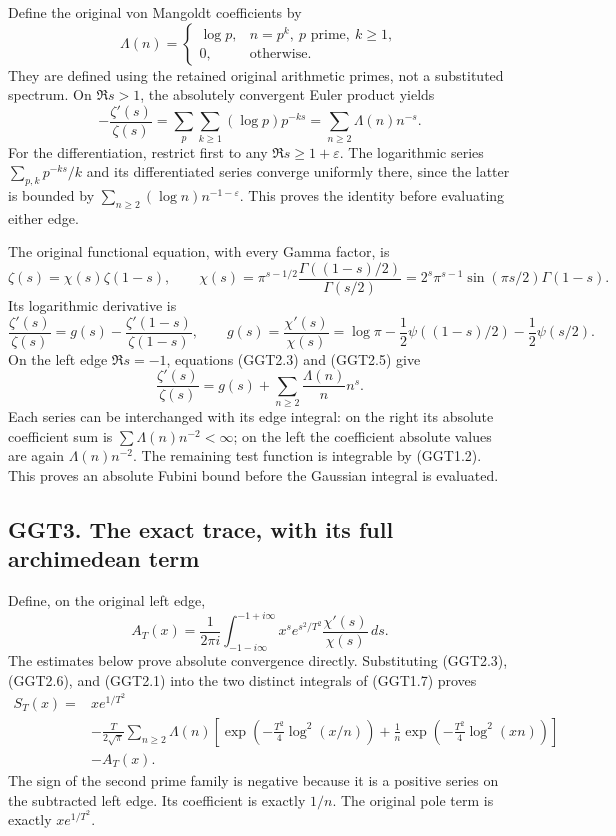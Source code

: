 Define the original von Mangoldt coefficients by \[
\Lambda(n)=
\begin{cases}\log p,&n=p^k,\ p\text{ prime},\ k\ge1,\\0,&\text{otherwise}.\end{cases}
\tag{GGT2.2}
\] They are defined using the retained original arithmetic primes, not a
substituted spectrum. On \(\Re s>1\), the absolutely convergent Euler
product yields \[
-\frac{\zeta'(s)}{\zeta(s)}
=\sum_p\sum_{k\ge1}(\log p)p^{-ks}
=\sum_{n\ge2}\Lambda(n)n^{-s}.
\tag{GGT2.3}
\] For the differentiation, restrict first to any
\(\Re s\ge1+\varepsilon\). The logarithmic series
\(\sum_{p,k}p^{-ks}/k\) and its differentiated series converge uniformly
there, since the latter is bounded by
\(\sum_{n\ge2}(\log n)n^{-1-\varepsilon}\). This proves the identity
before evaluating either edge.

The original functional equation, with every Gamma factor, is \[
\zeta(s)=\chi(s)\zeta(1-s),\qquad
\chi(s)=\pi^{s-1/2}
\frac{\Gamma((1-s)/2)}{\Gamma(s/2)}
=2^s\pi^{s-1}\sin(\pi s/2)\Gamma(1-s).
\tag{GGT2.4}
\] Its logarithmic derivative is \[
\frac{\zeta'(s)}{\zeta(s)}
=g(s)-\frac{\zeta'(1-s)}{\zeta(1-s)},
\qquad
g(s)=\frac{\chi'(s)}{\chi(s)}
=\log\pi-\frac12\psi((1-s)/2)-\frac12\psi(s/2).
\tag{GGT2.5}
\] On the left edge \(\Re s=-1\), equations (GGT2.3) and (GGT2.5) give
\[
\frac{\zeta'(s)}{\zeta(s)}
=g(s)+\sum_{n\ge2}\frac{\Lambda(n)}n n^s.
\tag{GGT2.6}
\] Each series can be interchanged with its edge integral: on the right
its absolute coefficient sum is \(\sum\Lambda(n)n^{-2}<\infty\); on the
left the coefficient absolute values are again \(\Lambda(n)n^{-2}\). The
remaining test function is integrable by (GGT1.2). This proves an
absolute Fubini bound before the Gaussian integral is evaluated.

\subsection{GGT3. The exact trace, with its full archimedean
term}\label{ggt3.-the-exact-trace-with-its-full-archimedean-term}

Define, on the original left edge, \[
A_T(x)=\frac1{2\pi i}
\int_{-1-i\infty}^{-1+i\infty}
x^s e^{s^2/T^2}\frac{\chi'(s)}{\chi(s)}\,ds .
\tag{GGT3.1}
\] The estimates below prove absolute convergence directly. Substituting
(GGT2.3), (GGT2.6), and (GGT2.1) into the two distinct integrals of
(GGT1.7) proves \[
\boxed{
\begin{aligned}
S_T(x)= {}&x e^{1/T^2}\\
&-\frac{T}{2\sqrt\pi}
\sum_{n\ge2}\Lambda(n)\left[
\exp\left(-\frac{T^2}{4}\log^2(x/n)\right)
+\frac1n\exp\left(-\frac{T^2}{4}\log^2(xn)\right)
\right]\\
&-A_T(x).
\end{aligned}}
\tag{GGT3.2}
\] The sign of the second prime family is negative because it is a
positive series on the subtracted left edge. Its coefficient is exactly
\(1/n\). The original pole term is exactly \(x e^{1/T^2}\).

